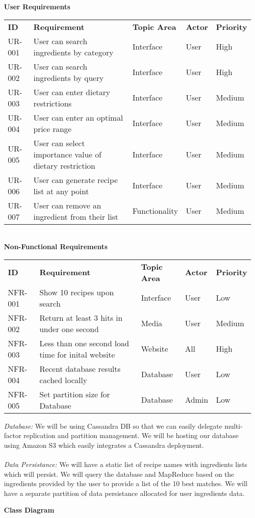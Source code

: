 \documentclass[12pt]{article}
\begin{document}
\begin{center}
 \textbf{User Requirements} \\
\begin{tabular}{ l  l  l  l  l  }
  \textbf{ID}  & \textbf{Requirement} & \textbf{Topic Area} & \textbf{Actor} & \textbf{Priority} \\  \rowcolor[gray]{.95}  \hline
  UR-001 & User can search ingredients by category & Interface & User & High \\  
  UR-002 & User can search ingredients by query & Interface & User & High \\  \rowcolor[gray]{.95}
  UR-003 & User can enter dietary restrictions & Interface & User & Medium \\  
  UR-004 & User can enter an optimal price range & Interface & User & Medium \\  \rowcolor[gray]{.95}
  UR-005 & User can select importance value of dietary restriction & Interface & User & Medium \\
  UR-006 & User can generate recipe list at any point & Interface & User & Medium \\ \rowcolor[gray]{.95}
  UR-007 & User can remove an ingredient from their list & Functionality & User & Medium \\
\end{tabular}
\\
  \vspace{1cm}
  \textbf{Non-Functional Requirements}
\begin{tabular}{ l  l  l  l  l  }
  \hline
  \textbf{ID}  & \textbf{Requirement} & \textbf{Topic Area} & \textbf{Actor} & \textbf{Priority} \\  \rowcolor[gray]{.95}
  NFR-001 & Show 10 recipes upon search  &  Interface & User & Low  \\  
  NFR-002 & Return at least 3 hits in under one second & Media & User &  Medium\\  \rowcolor[gray]{.95}
  NFR-003 & Less than one second load time for inital website &  Website & All & High \\ 
  NFR-004 & Recent database results cached locally & Database & User & Low \\  \rowcolor[gray]{.95}
  NFR-005 & Set partition size for Database & Database & Admin & Low \\ 
\end{tabular}
\end{center}

\newpage
\textit{Database: } We will be using Cassandra DB so that we can easily delegate multi-factor replication and partition management. We will be hosting our database using
Amazon S3 which easily integrates a Cassandra deployment. \\
\vspace{1cm} \\
\textit{Data Persistance: } We will have a static list of recipe names with ingredients lists which will persist. We will query the database and MapReduce based on the ingredients
provided by the user to provide a list of the 10 best matches. We will have a separate partition of data persistance allocated for user ingredients data. 

\newpage
\begin{center}
  \textbf{Class Diagram}
\end{center}
\end{document}
